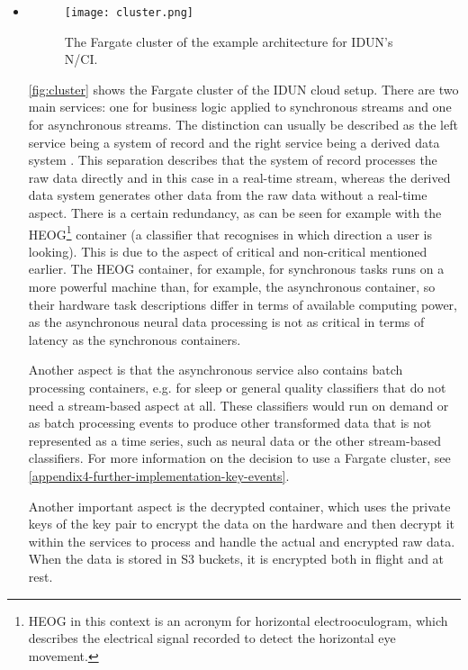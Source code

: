 \begin{itemize}

  \item \begin{figure}[!ht]
          \centering
          \texttt{[image: cluster.png]}
          \caption{The Fargate cluster of the example architecture for IDUN's N/CI.}
          \label{fig:cluster}
        \end{figure}

        \autoref{fig:cluster} shows the Fargate cluster of the IDUN cloud setup. There are two main services: one for business logic applied to synchronous streams and one for asynchronous streams. The distinction can usually be described as the left service being a system of record and the right service being a derived data system \citep{kleppmann_designing_2017}. This separation describes that the system of record processes the raw data directly and in this case in a real-time stream, whereas the derived data system generates other data from the raw data without a real-time aspect. There is a certain redundancy, as can be seen for example with the HEOG\footnote{HEOG in this context is an acronym for horizontal electrooculogram, which describes the electrical signal recorded to detect the horizontal eye movement.} container (a classifier that recognises in which direction a user is looking). This is due to the aspect of critical and non-critical mentioned earlier. The HEOG container, for example, for synchronous tasks runs on a more powerful machine than, for example, the asynchronous container, so their hardware task descriptions differ in terms of available computing power, as the asynchronous neural data processing is not as critical in terms of latency as the synchronous containers.

        Another aspect is that the asynchronous service also contains batch processing containers, e.g. for sleep or general quality classifiers that do not need a stream-based aspect at all. These classifiers would run on demand or as batch processing events to produce other transformed data that is not represented as a time series, such as neural data or the other stream-based classifiers. For more information on the decision to use a Fargate cluster, see \autoref{appendix4-further-implementation-key-events}.

        Another important aspect is the decrypted container, which uses the private keys of the key pair to encrypt the data on the hardware and then decrypt it within the services to process and handle the actual and encrypted raw data. When the data is stored in S3 buckets, it is encrypted both in flight and at rest.


\end{itemize}
